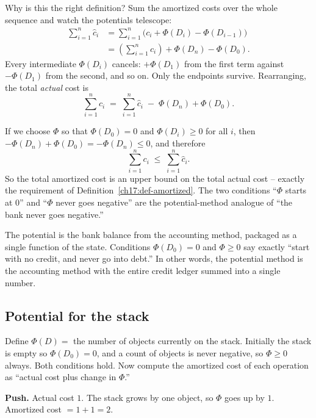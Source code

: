 Why is this the right definition? Sum the amortized costs over the whole sequence
and watch the potentials telescope:
\begin{align*}
  \sum_{i=1}^{n} \hat{c}_i
  &= \sum_{i=1}^{n}\bigl(c_i + \Phi(D_i) - \Phi(D_{i-1})\bigr) \\
  &= \left(\sum_{i=1}^{n} c_i\right) + \Phi(D_n) - \Phi(D_0).
\end{align*}
Every intermediate $\Phi(D_i)$ cancels: $+\Phi(D_1)$ from the first term against
$-\Phi(D_1)$ from the second, and so on. Only the endpoints survive. Rearranging,
the total \emph{actual} cost is
\[
  \sum_{i=1}^{n} c_i \;=\; \sum_{i=1}^{n}\hat{c}_i \;-\; \Phi(D_n) + \Phi(D_0).
\]

\begin{formalbox}
If we choose $\Phi$ so that $\Phi(D_0) = 0$ and $\Phi(D_i) \ge 0$ for all $i$,
then $-\Phi(D_n) + \Phi(D_0) = -\Phi(D_n) \le 0$, and therefore
\[
  \sum_{i=1}^{n} c_i \;\le\; \sum_{i=1}^{n} \hat{c}_i.
\]
So the total amortized cost is an upper bound on the total actual cost -- exactly
the requirement of Definition~\ref{ch17:def-amortized}. The two conditions
``$\Phi$ starts at $0$'' and ``$\Phi$ never goes negative'' are the potential-method
analogue of ``the bank never goes negative.''
\end{formalbox}

\begin{focusbox}
The potential is the bank balance from the accounting method, packaged as a
single function of the state. Conditions $\Phi(D_0)=0$ and $\Phi \ge 0$ say exactly
``start with no credit, and never go into debt.'' In other words, the potential
method is the accounting method with the entire credit ledger summed into a
single number.
\end{focusbox}

\subsection{Potential for the stack}

Define $\Phi(D) = $ the number of objects currently on the stack. Initially the
stack is empty so $\Phi(D_0) = 0$, and a count of objects is never negative, so
$\Phi \ge 0$ always. Both conditions hold. Now compute the amortized cost of each
operation as ``actual cost plus change in $\Phi$.''

\textbf{Push.} Actual cost $1$. The stack grows by one object, so $\Phi$ goes up by
$1$. Amortized cost $= 1 + 1 = 2$.

